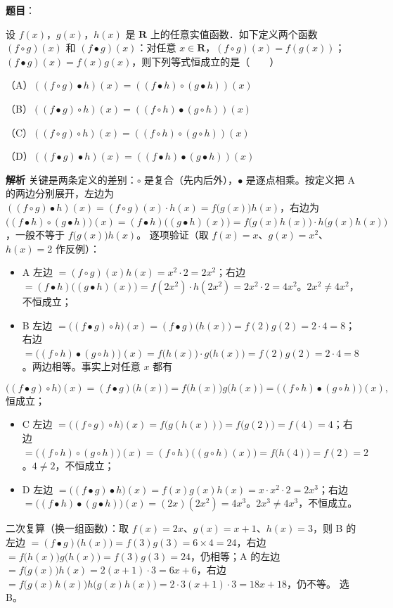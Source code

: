 \begin{answer}

\textbf{题目}：

设 $f(x)$，$g(x)$，$h(x)$ 是 $\mathbf R$ 上的任意实值函数．如下定义两个函数 $(f\circ g)(x)$ 和 $(f\bullet g)(x)$：对任意 $x\in\mathbf R$，$(f\circ g)(x)=f(g(x))$；$(f\bullet g)(x)=f(x)g(x)$，则下列等式恒成立的是\mbox{（　　）}

（A）$((f\circ g)\bullet h)(x)=((f\bullet h)\circ(g\bullet h))(x)$

（B）$((f\bullet g)\circ h)(x)=((f\circ h)\bullet(g\circ h))(x)$

（C）$((f\circ g)\circ h)(x)=((f\circ h)\circ(g\circ h))(x)$

（D）$((f\bullet g)\bullet h)(x)=((f\bullet h)\bullet(g\bullet h))(x)$

\textbf{解析}
关键是两条定义的差别：$\circ$ 是复合（先内后外），$\bullet$ 是逐点相乘。按定义把 A 的两边分别展开，左边为 $\left((f\circ g)\bullet h\right)(x)=(f\circ g)(x)\cdot h(x)=f\big(g(x)\big)h(x)$，右边为 $\big((f\bullet h)\circ(g\bullet h)\big)(x)=(f\bullet h)\big((g\bullet h)(x)\big)=f\big(g(x)h(x)\big)\cdot h\big(g(x)h(x)\big)$，一般不等于 $f\big(g(x)\big)h(x)$。
逐项验证（取 $f(x)=x$、$g(x)=x^2$、$h(x)=2$ 作反例）：
\begin{itemize}
\item A 左边 $=(f\circ g)(x)h(x)=x^2\cdot2=2x^2$；右边 $=(f\bullet h)\big((g\bullet h)(x)\big)=f(2x^2)\cdot h(2x^2)=2x^2\cdot2=4x^2$。$2x^2\neq4x^2$，不恒成立；
\item B 左边 $=\big((f\bullet g)\circ h\big)(x)=(f\bullet g)\big(h(x)\big)=f(2)g(2)=2\cdot4=8$；右边 $=\big((f\circ h)\bullet(g\circ h)\big)(x)=f\big(h(x)\big)\cdot g\big(h(x)\big)=f(2)g(2)=2\cdot4=8$。两边相等。事实上对任意 $x$ 都有
\end{itemize}
\nopagebreak[4]
\[
\big((f\bullet g)\circ h\big)(x)=(f\bullet g)\big(h(x)\big)=f\big(h(x)\big)g\big(h(x)\big)=\big((f\circ h)\bullet(g\circ h)\big)(x),
\]
恒成立；
\begin{itemize}
\item C 左边 $=\big((f\circ g)\circ h\big)(x)=f\big(g(h(x))\big)=f\big(g(2)\big)=f(4)=4$；右边 $=\big((f\circ h)\circ(g\circ h)\big)(x)=(f\circ h)\big((g\circ h)(x)\big)=f\big(h(4)\big)=f(2)=2$。$4\neq2$，不恒成立；
\item D 左边 $=\big((f\bullet g)\bullet h\big)(x)=f(x)g(x)h(x)=x\cdot x^2\cdot2=2x^3$；右边 $=\big((f\bullet h)\bullet(g\bullet h)\big)(x)=(2x)(2x^2)=4x^3$。$2x^3\neq4x^3$，不恒成立。
\end{itemize}
二次复算（换一组函数）：取 $f(x)=2x$、$g(x)=x+1$、$h(x)=3$，则 B 的左边 $=(f\bullet g)\big(h(x)\big)=f(3)g(3)=6\times4=24$，右边 $=f\big(h(x)\big)g\big(h(x)\big)=f(3)g(3)=24$，仍相等；A 的左边 $=f\big(g(x)\big)h(x)=2(x+1)\cdot3=6x+6$，右边 $=f\big(g(x)h(x)\big)h\big(g(x)h(x)\big)=2\cdot3(x+1)\cdot3=18x+18$，仍不等。
选 B。


\end{answer}
